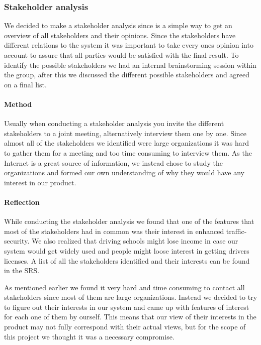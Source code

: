 \documentclass[10pt]{article}
\begin{document}
\subsubsection{Stakeholder analysis}
We decided to make a stakeholder analysis since is a simple way to get an overview of all stakeholders and their opinions. Since the stakeholders have different relations to the system it was important to take every ones opinion into account to assure that all parties would be satisfied with the final result. To identify the possible stakeholders we had an internal brainstorming session within the group, after this we discussed the different possible stakeholders and agreed on a final list.

\paragraph{Method}
\hfill \break
Usually when conducting a stakeholder analysis you invite the different stakeholders to a joint meeting, alternatively interview them one by one. Since almost all of the stakeholders we identified were large organizations it was hard to gather them for a meeting and too time consuming to interview them. As the Internet is a great source of information, we instead chose to study the organizations and formed our own understanding of why they would have any interest in our product. 

\paragraph{Reflection}
\hfill \break
While conducting the stakeholder analysis we found that one of the features that most of the stakeholders had in common was their interest in enhanced traffic-security. We also realized that driving schools might lose income in case our system would get widely used and people might loose interest in getting drivers licenses. A list of all the stakeholders identified and their interests can be found in the SRS\cite{srs}. 

\noindent As mentioned earlier we found it very hard and time consuming to contact all stakeholders since most of them are large organizations. Instead we decided to try to figure out their interests in our system and came up with features of interest for each one of them by ourself. This means that our view of their interests in the product may not fully correspond with their actual views, but for the scope of this project we thought it was a necessary compromise.
\end{document}
